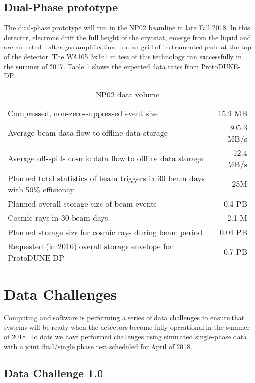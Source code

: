 \subsection{Dual-Phase prototype}

The dual-phase prototype will run in the NP02 beamline in late Fall 2018.  In this detector, electrons drift the full height of the cryostat, emerge from the liquid and are collected - after gas amplification - on an grid of instrumented pads at the top of the detector.  The WA105 3x1x1 m test of this technology ran successfully in the summer of 2017\cite{Murphy:20170516}.  Table \ref{tab:np02_data_rate} shows the expected data rates from ProtoDUNE-DP. 

\begin{table}[htbp]
  \centering
  \begin{tabular}[h]{l|r}
\hline
     Compressed, non-zero-suppressed event size & 15.9 MB\\
    Average beam data flow to offline data storage &   305.3 MB/s  \\
    Average off-spills cosmic data flow to offline data storage &   12.4 MB/s\\
    Planned total statistics of beam triggers in 30 beam days with 50\% efficiency&25M\\
    Planned overall storage size of beam events&   0.4 PB\\
   Cosmic rays in 30  beam days&  2.1  M\\
   Planned storage size for cosmic rays during beam period&  0.04 PB\\
   Requested (in 2016) overall storage envelope for ProtoDUNE-DP&0.7 PB \\
    \hline
  \end{tabular}
 \caption{NP02 data volume}
  \label{tab:np02_data_rate}
\end{table}

\section{Data Challenges}

Computing and software is performing a series of data challenges to ensure that systems will be ready when the detectors become fully operational in the summer of 2018.  To date we have performed challenges using simulated single-phase data with a joint dual/single phase test scheduled for April of 2018.

\subsection{Data Challenge 1.0}

